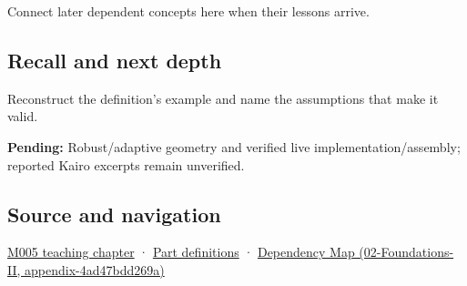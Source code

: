 Connect later dependent concepts here when their lessons arrive.

\subsection{Recall and next depth}\label{recall-and-next-depth}

Reconstruct the definition's example and name the assumptions that make it valid.

\textbf{Pending:} Robust/adaptive geometry and verified live implementation/assembly; reported Kairo excerpts remain unverified.

\subsection{Source and navigation}\label{source-and-navigation}

\href{Continuous\%20Notes/Computing\%20Foundations\%20-\%20From\%20Bits\%20to\%20C++\%20and\%20Systems\%20APIs\#When\%20arithmetic\%20meets\%20uncertainty}{M005 teaching chapter} · \hyperref[appendix-fd090d982a15]{Part definitions} · \href{}{Dependency Map (02-Foundations-II, appendix-4ad47bdd269a)}
